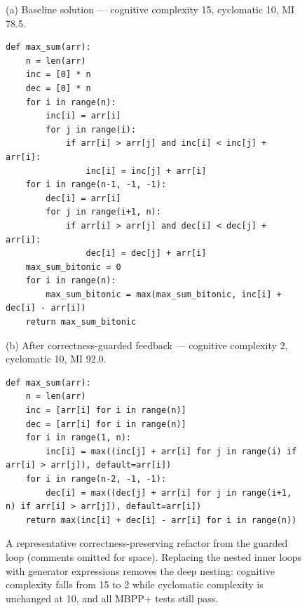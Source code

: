 \begin{figure}[t]
  \centering
  \begin{minipage}{\textwidth}
  \footnotesize (a) Baseline solution --- cognitive complexity 15, cyclomatic 10, MI 78.5.
  \begin{lstlisting}[basicstyle=\ttfamily\footnotesize,numbers=none]
def max_sum(arr):
    n = len(arr)
    inc = [0] * n
    dec = [0] * n
    for i in range(n):
        inc[i] = arr[i]
        for j in range(i):
            if arr[i] > arr[j] and inc[i] < inc[j] + arr[i]:
                inc[i] = inc[j] + arr[i]
    for i in range(n-1, -1, -1):
        dec[i] = arr[i]
        for j in range(i+1, n):
            if arr[i] > arr[j] and dec[i] < dec[j] + arr[i]:
                dec[i] = dec[j] + arr[i]
    max_sum_bitonic = 0
    for i in range(n):
        max_sum_bitonic = max(max_sum_bitonic, inc[i] + dec[i] - arr[i])
    return max_sum_bitonic
  \end{lstlisting}
  \vspace{0.4em}
  \footnotesize (b) After correctness-guarded feedback --- cognitive complexity 2, cyclomatic 10, MI 92.0.
  \begin{lstlisting}[basicstyle=\ttfamily\scriptsize,numbers=none]
def max_sum(arr):
    n = len(arr)
    inc = [arr[i] for i in range(n)]
    dec = [arr[i] for i in range(n)]
    for i in range(1, n):
        inc[i] = max((inc[j] + arr[i] for j in range(i) if arr[i] > arr[j]), default=arr[i])
    for i in range(n-2, -1, -1):
        dec[i] = max((dec[j] + arr[i] for j in range(i+1, n) if arr[i] > arr[j]), default=arr[i])
    return max(inc[i] + dec[i] - arr[i] for i in range(n))
  \end{lstlisting}
  \end{minipage}
  \caption{A representative correctness-preserving refactor from the guarded loop
    (comments omitted for space). Replacing the nested inner loops with generator
    expressions removes the deep nesting: cognitive complexity falls from 15 to 2
    while cyclomatic complexity is unchanged at 10, and all MBPP+ tests still pass.}
  \label{fig:example}
\end{figure}

